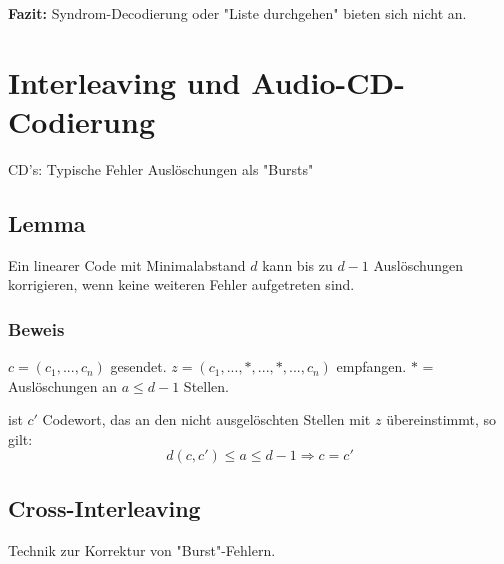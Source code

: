 \documentclass[a4paper, openany]{book}
\begin{document}
\textbf{Fazit:} Syndrom-Decodierung oder "Liste durchgehen" bieten sich nicht an.

\chapter{Interleaving und Audio-CD-Codierung}

CD's: Typische Fehler Auslöschungen als "Bursts"

\section{Lemma}

Ein linearer Code mit Minimalabstand $d$ kann bis zu $d-1$ Auslöschungen korrigieren, wenn keine weiteren Fehler aufgetreten sind. 

\subsection{Beweis}

$c = (c_1, ..., c_n)$ gesendet. $z = (c_1, ..., *, ..., *, ..., c_n)$ empfangen. $*$ = Auslöschungen an $a \le d-1$ Stellen.

\par \medskip

ist $c'$ Codewort, das an den nicht ausgelöschten Stellen mit $z$ übereinstimmt, so gilt: \[ d(c, c') \le a  \le d-1 \Rightarrow c = c' \]

\section{Cross-Interleaving}

Technik zur Korrektur von "Burst"-Fehlern.
\end{document}

